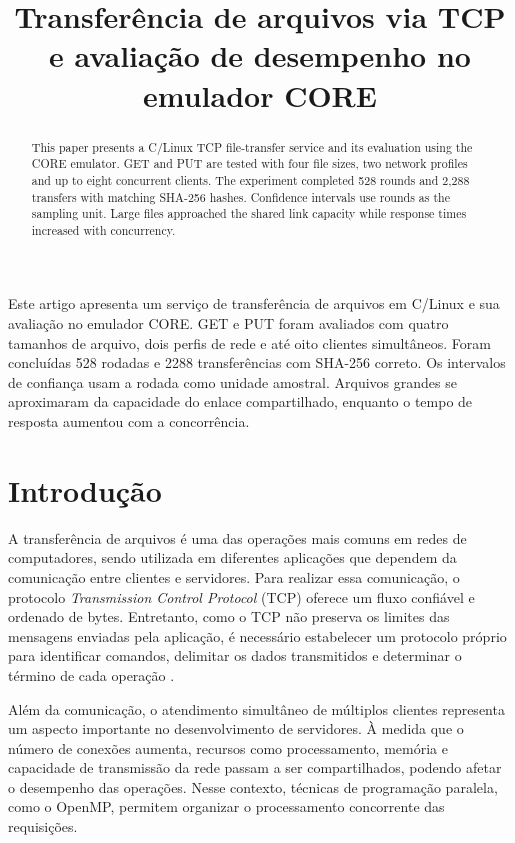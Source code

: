 \documentclass[12pt]{article}
\title{Transferência de arquivos via TCP e avaliação de desempenho no emulador CORE}
\begin{document}
\maketitle

\begin{abstract}
	This paper presents a C/Linux TCP file-transfer service and its evaluation using the CORE emulator. GET and PUT are tested with four file sizes, two network profiles and up to eight concurrent clients. The experiment completed 528 rounds and 2,288 transfers with matching SHA-256 hashes. Confidence intervals use rounds as the sampling unit. Large files approached the shared link capacity while response times increased with concurrency.
\end{abstract}

\begin{resumo}
	Este artigo apresenta um serviço de transferência de arquivos em C/Linux e sua avaliação no emulador CORE. GET e PUT foram avaliados com quatro tamanhos de arquivo, dois perfis de rede e até oito clientes simultâneos. Foram concluídas 528 rodadas e 2288 transferências com SHA-256 correto. Os intervalos de confiança usam a rodada como unidade amostral. Arquivos grandes se aproximaram da capacidade do enlace compartilhado, enquanto o tempo de resposta aumentou com a concorrência.
\end{resumo}


\section{Introdução}
\label{sec:introducao}

A transferência de arquivos é uma das operações mais comuns em redes de computadores, sendo utilizada em diferentes aplicações que dependem da comunicação entre clientes e servidores. Para realizar essa comunicação, o protocolo \textit{Transmission Control Protocol} (TCP) oferece um fluxo confiável e ordenado de bytes. Entretanto, como o TCP não preserva os limites das mensagens enviadas pela aplicação, é necessário estabelecer um protocolo próprio para identificar comandos, delimitar os dados transmitidos e determinar o término de cada operação \cite{tcp}.

Além da comunicação, o atendimento simultâneo de múltiplos clientes representa um aspecto importante no desenvolvimento de servidores. À medida que o número de conexões aumenta, recursos como processamento, memória e capacidade de transmissão da rede passam a ser compartilhados, podendo afetar o desempenho das operações. Nesse contexto, técnicas de programação paralela, como o OpenMP, permitem organizar o processamento concorrente das requisições.
\end{document}
